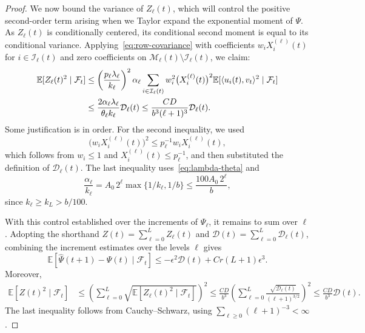 \documentclass[reqno]{amsart}
\theoremstyle{definition}
\newcommand{\E}{\mathbb E}
\newcommand{\ip}[2]{\langle#1,#2\rangle}
\begin{document}
\begin{proof}
We now bound the variance of $Z_\ell(t)$, which will control the positive second-order term arising when we Taylor expand the exponential moment of $\Psi$. As $Z_\ell(t)$ is conditionally centered, its conditional second moment is equal to its conditional variance. Applying~\eqref{eq:row-covariance} with coefficients $w_iX_i^{(\ell)}(t)$ for $i\in\mathcal I_\ell(t)$ and zero coefficients on $\mathcal M_\ell(t)\setminus\mathcal I_\ell(t)$, we claim:
\begin{align}
  \E[Z_\ell(t)^2\mid\mathcal F_t] &\le \left(\frac{p_\ell\lambda_\ell}{k_\ell}\right)^2 \alpha_\ell \sum_{i\in\mathcal I_\ell(t)} w_i^2\bigl(X_i^{(\ell)}(t)\bigr)^2 \E[\ip{u_i(t)}{v_t}^2\mid\mathcal F_t]\notag\\
  &\le \frac{2\alpha_\ell\lambda_\ell}{\theta_\ell k_\ell} \mathcal D_\ell(t) \le\frac{CD}{b^3(\ell+1)^3}\mathcal D_\ell(t). \label{eq:level-variance}
\end{align}
Some justification is in order. For the second inequality, we used
\[ \bigl(w_iX_i^{(\ell)}(t)\bigr)^2 \le p_\ell^{-1}w_iX_i^{(\ell)}(t), \]
which follows from $w_i\le1$ and $X_i^{(\ell)}(t)\le p_\ell^{-1}$, and then substituted the definition of $\mathcal D_\ell(t)$. The last inequality uses~\eqref{eq:lambda-theta} and
\[ \frac{\alpha_\ell}{k_\ell} =A_0\,2^\ell\max\{1/k_\ell,1/b\} \le\frac{100A_0\,2^\ell}{b}, \]
since $k_\ell\ge k_L>b/100$.

With this control established over the increments of $\Psi_\ell$, it remains to sum over $\ell$. Adopting the shorthand $ Z(t)=\sum_{\ell=0}^L Z_\ell(t)$ and $ \mathcal D(t)=\sum_{\ell=0}^L\mathcal D_\ell(t)$, combining the increment estimates over the levels $\ell$ gives
\[ \E[\widehat\Psi(t+1)-\Psi(t)\mid\mathcal F_t] \le-\epsilon^2\mathcal D(t)+Cr(L+1)\epsilon^3. \]
Moreover,
\begin{equation}\label{eq:all-variance} \begin{aligned} \E[Z(t)^2\mid\mathcal F_t] &\le \left(\sum_{\ell=0}^L \sqrt{\E[Z_\ell(t)^2\mid\mathcal F_t]}\right)^2 \le\frac{CD}{b^3} \left(\sum_{\ell=0}^L \frac{\sqrt{\mathcal D_\ell(t)}}{(\ell+1)^{3/2}} \right)^2 \le\frac{CD}{b^3}\mathcal D(t). \end{aligned} \end{equation}
The last inequality follows from Cauchy--Schwarz, using $\sum_{\ell\ge0}(\ell+1)^{-3}<\infty$.


\end{proof}
\end{document}
